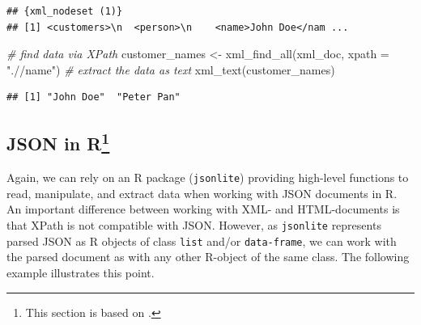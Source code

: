 \documentclass[
  12pt,
]{style/krantz}
\newenvironment{Shaded}{\begin{snugshade}}{\end{snugshade}}
\newcommand{\AttributeTok}[1]{\textcolor[rgb]{0.77,0.63,0.00}{#1}}
\newcommand{\CommentTok}[1]{\textcolor[rgb]{0.56,0.35,0.01}{\textit{#1}}}
\newcommand{\FunctionTok}[1]{\textcolor[rgb]{0.00,0.00,0.00}{#1}}
\newcommand{\NormalTok}[1]{#1}
\newcommand{\OtherTok}[1]{\textcolor[rgb]{0.56,0.35,0.01}{#1}}
\newcommand{\SpecialCharTok}[1]{\textcolor[rgb]{0.00,0.00,0.00}{#1}}
\newcommand{\StringTok}[1]{\textcolor[rgb]{0.31,0.60,0.02}{#1}}
\begin{document}
\begin{verbatim}
## {xml_nodeset (1)}
## [1] <customers>\n  <person>\n    <name>John Doe</nam ...
\end{verbatim}

\begin{Shaded}
\begin{Highlighting}[]
\CommentTok{\# find data via XPath}
\NormalTok{customer\_names }\OtherTok{\textless{}{-}} \FunctionTok{xml\_find\_all}\NormalTok{(xml\_doc, }\AttributeTok{xpath =} \StringTok{".//name"}\NormalTok{)}
\CommentTok{\# extract the data as text}
\FunctionTok{xml\_text}\NormalTok{(customer\_names)}
\end{Highlighting}
\end{Shaded}

\begin{verbatim}
## [1] "John Doe"  "Peter Pan"
\end{verbatim}

\hypertarget{json-in-r}{%
\subsection[JSON in R]{\texorpdfstring{JSON in R\footnote{This section is based on \citet{umatter_2018b}.}}{JSON in R}}\label{json-in-r}}

Again, we can rely on an R package (\texttt{jsonlite}) providing high-level functions to read, manipulate, and extract data when working with JSON documents in R. An important difference between working with XML- and HTML-documents is that XPath is not compatible with JSON. However, as \texttt{jsonlite} represents parsed JSON as R objects of class \texttt{list} and/or \texttt{data-frame}, we can work with the parsed document as with any other R-object of the same class. The following example illustrates this point.

\begin{Shaded}
\end{Shaded}
\end{document}
